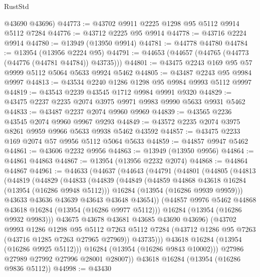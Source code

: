 \begin{lexlean}{RustStd}
\begin{coremodule}
      @43690
      @43696)
@44773 := @43702 @9911 @2225 @1298 @95 @5112 @9914 @5112 @7284
@44776 := @43712 @2225 @95 @9914
@44778 := @43716 @2224 @9914
@44780 := @13949 (@13950 @9914)
@44781 := @44778 @44780
@44784 := @13954 (@13956 @2224 @95)
@44791 := @44653 (@44657 (@44765 (@44773 (@44776 (@44781 @44784)) @43735)))
@44801 := @43475 @2243 @169 @95 @57 @9999 @5112 @5064 @5633 @9924 @5462
@44805 := @43487 @2243 @95 @9984 @9997
@44813 := @43534 @2240 @1286 @1298 @95 @9984 @9993 @5112 @9997
@44819 := @43543 @2239 @43545 @1712 @9984 @9991 @9320
@44829 := @43475 @2237 @2235 @2074 @3975 @9971 @9983 @9990 @5633 @9931 @5462
@44833 := @43487 @2237 @2074 @9960 @9969
@44839 := @43565 @2236 @43545 @2074 @9960 @9967 @9293
@44849 := @43572 @2235 @2074 @3975 @8261 @9959 @9966 @5633 @9938 @5462 @43592
@44857 := @43475 @2233 @169 @2074 @57 @9956 @5112 @5064 @5633
@44859 := @44857 @9947 @5462
@44861 := @43606 @2232 @9956
@44863 := @13949 (@13950 @9956)
@44864 := @44861 @44863
@44867 := @13954 (@13956 @2232 @2074)
@44868 := @44864 @44867
@44961 := @44633
    (@44637
      (@44643
        (@44791
          (@44801
            (@44805
              (@44813
                (@44819
                  (@44829
                    (@44833
                      (@44839
                        (@44849
                          (@44859 @44868 @43618 @16284 (@13954 (@16286 @9948 @5112)))
                          @16284
                          (@13954 (@16286 @9939 @9959)))
                        @43633
                        @43636
                        @43639
                        @43643
                        @43648
                        @43654))
                    (@44857 @9976 @5462 @44868 @43618 @16284 (@13954 (@16286 @9977 @5112)))
                    @16284
                    (@13954 (@16286 @9932 @9983)))
                  @43675
                  @43678
                  @43681
                  @43685
                  @43690
                  @43696)
                (@43702
                  @9993
                  @1286
                  @1298
                  @95
                  @5112
                  @7263
                  @5112
                  @7284
                  (@43712 @1286 @95 @7263 (@43716 @1285 @7263 @27965 @27969))
                  @43735)))
            @43618
            @16284
            (@13954 (@16286 @9925 @5112)))
          @16284
          (@13954 (@16286 @9843 @10002)))
        @27986
        @27989
        @27992
        @27996
        @28001
        @28007))
    @43618
    @16284
    (@13954 (@16286 @9836 @5112))
@44998 := @43430

\end{coremodule}
\end{lexlean}
